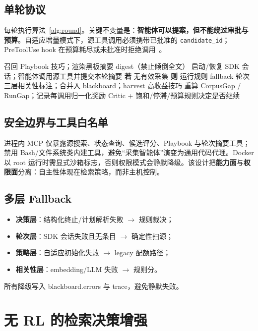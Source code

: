 \documentclass[conference]{IEEEtran}
\newcommand{\code}[1]{\texttt{\small #1}}
\begin{document}
\subsection{单轮协议}
每轮执行算法~\ref{alg:round}。关键不变量是：\textbf{智能体可以提案，但不能绕过审批与预算}。自适应增量模式下，源工具调用必须携带已批准的 \code{candidate\_id}；PreToolUse hook 在预算耗尽或未批准时拒绝调用~\cite{claudeagenthooks}。

\begin{algorithm}[!t]
\caption{混合控制面单轮协议}
\label{alg:round}
\begin{algorithmic}[1]
\State 召回 Playbook 技巧；渲染黑板摘要 digest（禁止倾倒全文）
\State 启动/恢复 SDK 会话；智能体调用源工具并提交本轮摘要
\State \textbf{若} 无有效采集 \textbf{则} 运行规则 fallback 轮次
\State 三层相关性标注；合并入 blackboard；harvest 高收益技巧
\State 重算 CorpusGap / RunGap；记录每调用归一化奖励
\State Critic + 饱和/停滞/预算规则决定是否继续
\end{algorithmic}
\end{algorithm}

\subsection{安全边界与工具白名单}
进程内 MCP 仅暴露源搜索、状态查询、候选评分、Playbook 与轮次摘要工具；禁用 Bash/文件系统类内建工具，避免“采集智能体”演变为通用代码代理。Docker 以 root 运行时需显式沙箱标志，否则权限模式会静默降级。该设计把\textbf{能力面}与\textbf{权限面}分离：自主性体现在检索策略，而非主机控制。

\subsection{多层 Fallback}
\begin{itemize}
  \item \textbf{决策层}：结构化终止/计划解析失败 $\rightarrow$ 规则裁决；
  \item \textbf{轮次层}：SDK 会话失败且无条目 $\rightarrow$ 确定性扫源；
  \item \textbf{策略层}：自适应初始化失败 $\rightarrow$ legacy 配额路径；
  \item \textbf{相关性层}：embedding/LLM 失败 $\rightarrow$ 规则分。
\end{itemize}
所有降级写入 blackboard.errors 与 trace，避免静默失败。

\section{无 RL 的检索决策增强}
\label{sec:decision}
\end{document}
